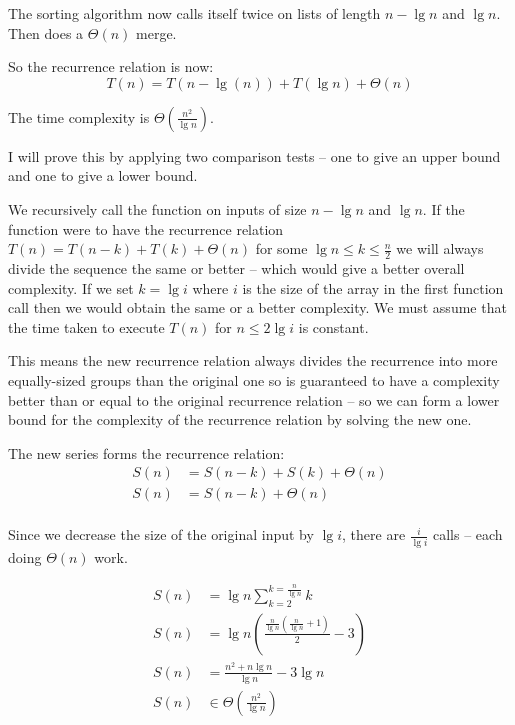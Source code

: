 \documentclass[10pt,\jkfside,a4paper]{article}
\begin{document}
\begin{enumerate}
The sorting algorithm now calls itself twice on lists of length $n - \lg n$ and $\lg n$.
Then does a $\Theta(n)$ merge.

So the recurrence relation is now:
\begin{equation}\label{complicatedrecurrence}
T(n) = T(n - \lg(n)) + T(\lg n) + \Theta(n)
\end{equation}

The time complexity is $\Theta\left(\frac{n^2}{\lg n}\right)$.

I will prove this by applying two comparison tests -- one to give an upper bound and one to give a lower bound. 

We recursively call the function on inputs of size $n - \lg n$ and $\lg n$. If the function were to have the recurrence 
relation $T(n) = T(n - k) + T(k) + \Theta(n)$ for some $\lg n \leq k \leq \frac{n}{2}$
we will always divide the sequence the same or better -- which would give a better overall complexity. 
If we set $k = \lg i$ where $i$ is the size of the array in the first function call then we would 
obtain the same or a better complexity. We must assume that the time taken to execute $T(n)$ for 
$n \leq 2 \lg i$ is constant.

This means the new recurrence relation always divides the recurrence into more equally-sized groups than the original one so 
is guaranteed to have a complexity better than or equal to the original recurrence relation -- so we can form a lower 
bound for the complexity of the recurrence relation by solving the new one.

The new series forms the recurrence relation:
\begin{equation}\label{lowerrecurrence}
\begin{split}
S(n) &= S(n - k) + S(k) + \Theta(n) \\
S(n) &= S(n - k) + \Theta(n) \\
\end{split}
\end{equation}

Since we decrease the size of the original input by $\lg i$, there are $\frac{i}{\lg i}$ calls -- each doing 
$\Theta(n)$ work.

\begin{equation}
\begin{split}
S(n) &= \lg n \sum_{k=2}^{k = \frac{n}{\lg n}} k \\
S(n) &= \lg n \left(\frac{\frac{n}{\lg n}(\frac{n}{\lg n} + 1)}{2} - 3 \right)\\
S(n) &= \frac{n^2 + n \lg n}{\lg n} - 3 \lg n\\
S(n) &\in \Theta\left(\frac{n^2}{\lg n}\right) \\
\end{split}
\end{equation}


\end{enumerate}
\end{document}
